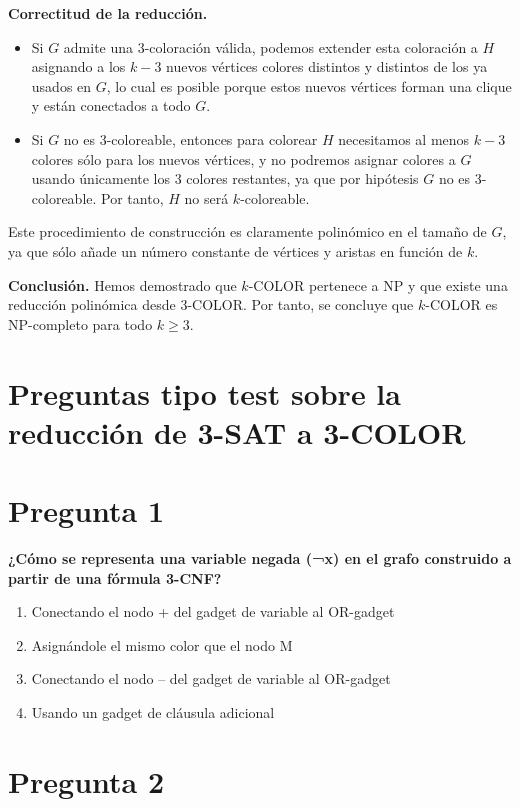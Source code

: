 \documentclass[a4paper,12pt]{article}
\begin{document}
\begin{itemize}
\textbf{Correctitud de la reducción.}
\begin{itemize}
    \item Si $G$ admite una 3-coloración válida, podemos extender esta coloración a $H$ asignando a los $k-3$ nuevos vértices colores distintos y distintos de los ya usados en $G$, lo cual es posible porque estos nuevos vértices forman una clique y están conectados a todo $G$.
    \item Si $G$ no es 3-coloreable, entonces para colorear $H$ necesitamos al menos $k-3$ colores sólo para los nuevos vértices, y no podremos asignar colores a $G$ usando únicamente los 3 colores restantes, ya que por hipótesis $G$ no es 3-coloreable. Por tanto, $H$ no será $k$-coloreable.
\end{itemize}

Este procedimiento de construcción es claramente polinómico en el tamaño de $G$, ya que sólo añade un número constante de vértices y aristas en función de $k$.

\textbf{Conclusión.} Hemos demostrado que \textsc{$k$-COLOR} pertenece a NP y que existe una reducción polinómica desde \textsc{3-COLOR}. Por tanto, se concluye que \textsc{$k$-COLOR} es NP-completo para todo $k \geq 3$.

\section{Preguntas tipo test sobre la reducción de 3-SAT a 3-COLOR}


\section*{Pregunta 1}

\textbf{¿Cómo se representa una variable negada (¬x) en el grafo construido a partir de una fórmula 3-CNF?}

\begin{enumerate}[label=\Alph*)]
    \item Conectando el nodo + del gadget de variable al OR-gadget
    \item Asignándole el mismo color que el nodo M
    \item {Conectando el nodo – del gadget de variable al OR-gadget} %
    \item Usando un gadget de cláusula adicional
\end{enumerate}

\section*{Pregunta 2}


\end{itemize}
\end{document}
